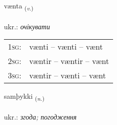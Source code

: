 \documentclass[frontgrid, backgrid]{flacards}\usepackage[]{graphicx}\usepackage[]{xcolor}
\begin{document}
\renewcommand{\flhead}{\vskip5pt \fboxsep=0pt {\small\bfseries\footnotesize Sagnorð | дієслово}}
\renewcommand{\fcfoot}{\vskip5pt \fboxsep=0pt \hspace{2pt}{\small\bfseries\footnotesize 2K}}

\renewcommand{\blhead}{\vskip5pt {\small\bfseries\footnotesize Sagnorð | дієслово }}
\renewcommand{\bcfoot}{\vskip5pt \hspace{2pt}{\small\bfseries\footnotesize 2K}}


{vænta \small{\textsubscript{(\textit{v.})}} \\[1ex] %
\textphonetic{[vain̥ta]} \\
ukr.: \emph{очікувати} \\  [2ex]
\renewcommand*{\arraystretch}{0.8}
\begin{tabular}{p{1cm}l}
\textsc{1sg}: & vænti -- vænti -- vænt \\ 
\textsc{2sg}: & væntir -- væntir -- vænt \\ 
\textsc{3sg}: & væntir -- vænti -- vænt \\ 
\end{tabular}
}

\renewcommand{\flhead}{\vskip5pt \fboxsep=0pt {\small\bfseries\footnotesize Nafnorð | іменник}}
\renewcommand{\fcfoot}{\vskip5pt \fboxsep=0pt \hspace{2pt}{\small\bfseries\footnotesize 2K}}

\renewcommand{\blhead}{\vskip5pt {\small\bfseries\footnotesize Nafnorð | іменник }}
\renewcommand{\bcfoot}{\vskip5pt \hspace{2pt}{\small\bfseries\footnotesize 2K}}


{samþykki \small{\textsubscript{(\textit{n.})}} \\[1ex] %
\textphonetic{[samθɪhcɪ]} \\
ukr.: \emph{згода; погодження} \\  [2ex]
\renewcommand*{\arraystretch}{0.8}
}
\end{document}
